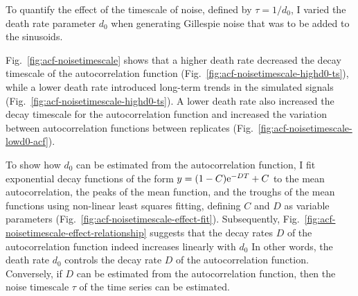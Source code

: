 To quantify the effect of the timescale of noise, defined by $\tau = 1/d_{0}$, I varied the death rate parameter $d_{0}$ when generating Gillespie noise that was to be added to the sinusoids.

Fig.\ \ref{fig:acf-noisetimescale} shows that a higher death rate decreased the decay timescale of the autocorrelation function (Fig.\ \ref{fig:acf-noisetimescale-highd0-ts}), while a lower death rate introduced long-term trends in the simulated signals (Fig.\ \ref{fig:acf-noisetimescale-highd0-ts}).
A lower death rate also increased the decay timescale for the autocorrelation function and increased the variation between autocorrelation functions between replicates (Fig.\ \ref{fig:acf-noisetimescale-lowd0-acf}).

To show how $d_{0}$ can be estimated from the autocorrelation function, I fit exponential decay functions of the form $y = (1-C)\mathrm{e}^{-DT}+C$ to the mean autocorrelation, the peaks of the mean function, and the troughs of the mean functions using non-linear least squares fitting, defining $C$ and $D$ as variable parameters (Fig.\ \ref{fig:acf-noisetimescale-effect-fit}).
Subsequently, Fig.\ \ref{fig:acf-noisetimescale-effect-relationship} suggests that the decay rates $D$ of the autocorrelation function indeed increases linearly with $d_{0}$
In other words, the death rate $d_{0}$ controls the decay rate $D$ of the autocorrelation function.
Conversely, if $D$ can be estimated from the autocorrelation function, then the noise timescale $\tau$ of the time series can be estimated.


